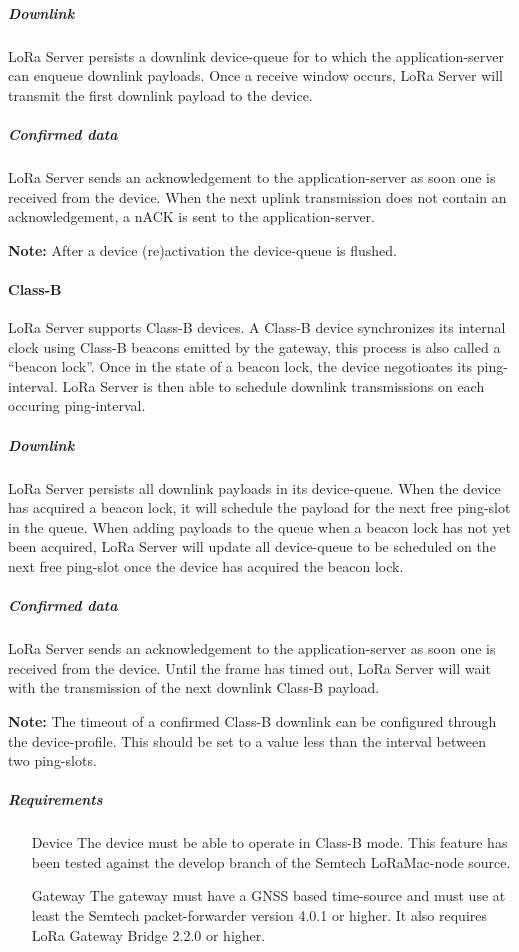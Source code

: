 \subparagraph{Downlink}
LoRa Server persists a downlink device-queue for to which the application-server can enqueue downlink payloads.
Once a receive window occurs,
	LoRa Server will transmit the first downlink payload to the device.

\subparagraph{Confirmed data}
LoRa Server sends an acknowledgement to the application-server as soon one is received from the device.
When the next uplink transmission does not contain an acknowledgement,
	a nACK is sent to the application-server.

\textbf{Note:}
	After a device (re)activation the device-queue is flushed.




\paragraph{Class-B}
LoRa Server supports Class-B devices.
A Class-B device synchronizes its internal clock using Class-B beacons emitted by the gateway,
	this process is also called a “beacon lock”.
Once in the state of a beacon lock,
	the device negotioates its ping-interval.
LoRa Server is then able to schedule downlink transmissions on each occuring ping-interval.

\subparagraph{Downlink}
LoRa Server persists all downlink payloads in its device-queue.
When the device has acquired a beacon lock,
	it will schedule the payload for the next free ping-slot in the queue.
When adding payloads to the queue when a beacon lock has not yet been acquired,
	LoRa Server will update all device-queue to be scheduled on the next free ping-slot once the device has acquired the beacon lock.

\subparagraph{Confirmed data}
LoRa Server sends an acknowledgement to the application-server as soon one is received from the device.
Until the frame has timed out,
	LoRa Server will wait with the transmission of the next downlink Class-B payload.

\textbf{Note:} The timeout of a confirmed Class-B downlink can be configured through the device-profile.
This should be set to a value less than the interval between two ping-slots.

\subparagraph{Requirements}

\begin{itemize}
	\item[Device]
	The device must be able to operate in Class-B mode.
This feature has been tested against the develop branch of the Semtech LoRaMac-node source.
	\item[Gateway]
	The gateway must have a GNSS based time-source and must use at least the Semtech packet-forwarder version 4.0.1 or higher.
It also requires LoRa Gateway Bridge 2.2.0 or higher.

\end{itemize}

